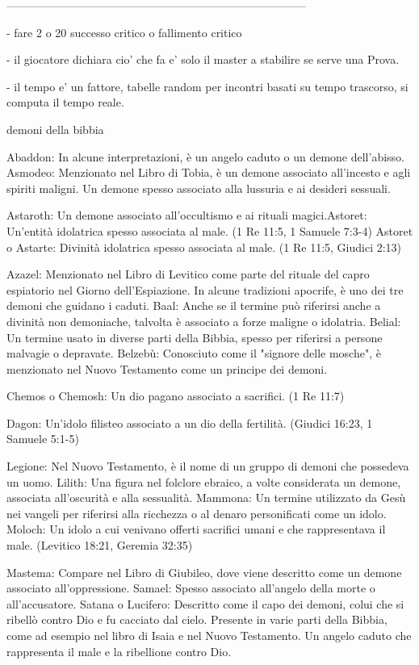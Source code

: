 \documentclass[12pt,a4paper,twoside,openany]{book}
\begin{document}
--------------------------------------------------------------------------------



- fare 2 o 20  successo critico o fallimento  critico

- il giocatore dichiara cio' che fa e' solo il master a stabilire se serve una Prova. 

- il tempo e' un fattore, tabelle random per incontri basati su tempo trascorso, si computa il tempo reale.



demoni della bibbia

Abaddon: In alcune interpretazioni, è un angelo caduto o un demone dell'abisso.
Asmodeo: Menzionato nel Libro di Tobia, è un demone associato all'incesto e agli spiriti maligni. Un demone spesso associato alla lussuria e ai desideri sessuali.

Astaroth: Un demone associato all'occultismo e ai rituali magici.Astoret: Un'entità idolatrica spesso associata al male. (1 Re 11:5, 1 Samuele 7:3-4)
Astoret o Astarte: Divinità idolatrica spesso associata al male. (1 Re 11:5, Giudici 2:13)



Azazel: Menzionato nel Libro di Levitico come parte del rituale del capro espiatorio nel Giorno dell'Espiazione. In alcune tradizioni apocrife, è uno dei tre demoni che guidano i caduti.
Baal: Anche se il termine può riferirsi anche a divinità non demoniache, talvolta è associato a forze maligne o idolatria.
Belial: Un termine usato in diverse parti della Bibbia, spesso per riferirsi a persone malvagie o depravate.
Belzebù: Conosciuto come il "signore delle mosche", è menzionato nel Nuovo Testamento come un principe dei demoni.

Chemos o Chemosh: Un dio pagano associato a sacrifici. (1 Re 11:7)


Dagon: Un'idolo filisteo associato a un dio della fertilità. (Giudici 16:23, 1 Samuele 5:1-5)


Legione: Nel Nuovo Testamento, è il nome di un gruppo di demoni che possedeva un uomo.
Lilith: Una figura nel folclore ebraico, a volte considerata un demone, associata all'oscurità e alla sessualità.
Mammona: Un termine utilizzato da Gesù nei vangeli per riferirsi alla ricchezza o al denaro personificati come un idolo.
Moloch: Un idolo a cui venivano offerti sacrifici umani e che rappresentava il male. (Levitico 18:21, Geremia 32:35)


Mastema: Compare nel Libro di Giubileo, dove viene descritto come un demone associato all'oppressione.
Samael: Spesso associato all'angelo della morte o all'accusatore.
Satana o Lucifero: Descritto come il capo dei demoni, colui che si ribellò contro Dio e fu cacciato dal cielo. Presente in varie parti della Bibbia, come ad esempio nel libro di Isaia e nel Nuovo Testamento. Un angelo caduto che rappresenta il male e la ribellione contro Dio.
\end{document}
